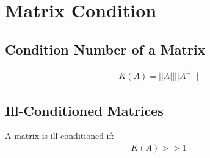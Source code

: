 \section{Matrix Condition}

	\subsection{Condition Number of a Matrix}
		\begin{align}
			K(A) = ||A||||A^{-1}||
		\end{align}

	\subsection{Ill-Conditioned Matrices}
		A matrix is ill-conditioned if:
		\begin{align}
			K(A) >> 1
		\end{align}
